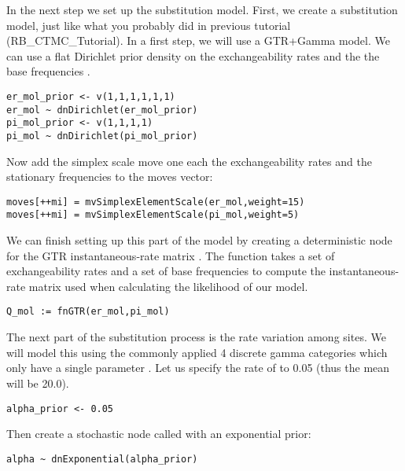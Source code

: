 In the next step we set up the substitution model.
First, we create a substitution model, just like what you probably did in previous tutorial (\EG RB\_CTMC\_Tutorial). 
In a first step, we will use a GTR+Gamma model.
We can use a flat Dirichlet prior density on the exchangeability rates  and the the base frequencies .
{\tt \begin{snugshade*}
\begin{lstlisting}
er_mol_prior <- v(1,1,1,1,1,1) 
er_mol ~ dnDirichlet(er_mol_prior)
pi_mol_prior <- v(1,1,1,1) 
pi_mol ~ dnDirichlet(pi_mol_prior)
\end{lstlisting}
\end{snugshade*}}
Now add the simplex scale move one each the exchangeability rates  and the stationary frequencies  to the moves vector:
{\tt \small \begin{snugshade*}
\begin{lstlisting}
moves[++mi] = mvSimplexElementScale(er_mol,weight=15) 
moves[++mi] = mvSimplexElementScale(pi_mol,weight=5)  
\end{lstlisting}
\end{snugshade*}}
We can finish setting up this part of the model by creating a deterministic node for the GTR instantaneous-rate matrix . 
The  function takes a set of exchangeability rates and a set of base frequencies to compute the instantaneous-rate matrix used when calculating the likelihood of our model.
{\tt \begin{snugshade*}
\begin{lstlisting}
Q_mol := fnGTR(er_mol,pi_mol)
\end{lstlisting}
\end{snugshade*}}
The next part of the substitution process is the rate variation among sites. We will model this using the commonly applied 4 discrete gamma categories which only have a single parameter .
Let us specify the rate of  to 0.05 (thus the mean will be 20.0).
{\tt\begin{snugshade*}
\begin{lstlisting}
alpha_prior <- 0.05                                                                             
\end{lstlisting}
\end{snugshade*}}
Then create a stochastic node called  with an exponential prior:
{\tt\begin{snugshade*}
\begin{lstlisting}
alpha ~ dnExponential(alpha_prior)
\end{lstlisting}
\end{snugshade*}}
